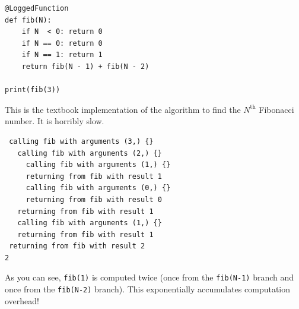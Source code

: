 
\begin{frame}[fragile]
%
\begin{codebox}
\begin{verbatim}
@LoggedFunction
def fib(N):
    if N  < 0: return 0
    if N == 0: return 0
    if N == 1: return 1
    return fib(N - 1) + fib(N - 2)

print(fib(3))
\end{verbatim}
\end{codebox}
%
\begin{hintbox}
This is the textbook implementation of the algorithm to find the $N^{\text{th}}$ Fibonacci number. It is horribly slow.
\end{hintbox}
%
\end{frame}


\begin{frame}[fragile]
%
\begin{cmdbox}
\begin{verbatim}
 calling fib with arguments (3,) {}
   calling fib with arguments (2,) {}
     calling fib with arguments (1,) {}
     returning from fib with result 1
     calling fib with arguments (0,) {}
     returning from fib with result 0
   returning from fib with result 1
   calling fib with arguments (1,) {}
   returning from fib with result 1
 returning from fib with result 2
2
\end{verbatim}
\end{cmdbox}
%
\begin{hintbox}
As you can see, \texttt{fib(1)} is computed twice (once from the \texttt{fib(N-1)} branch and once from the \texttt{fib(N-2)} branch).
This exponentially accumulates computation overhead!
\end{hintbox}
%
\end{frame}


